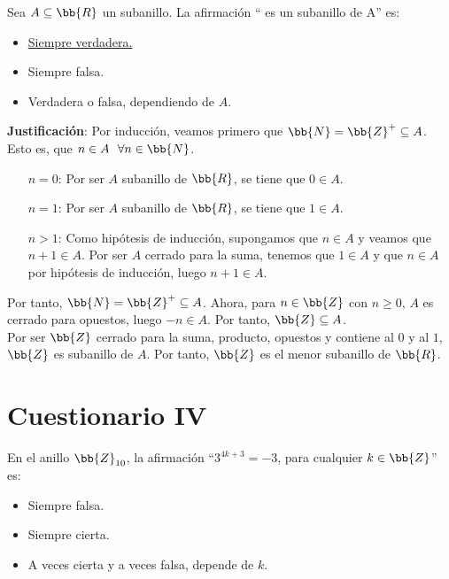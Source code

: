 \documentclass[12pt]{article}
\newcounter{ejercicio}[section] %
\newcounter{ejercicio}
\newcommand{\resetearcontador}{%
  \setcounter{ejercicio}{0} %
}
\begin{document}
    \begin{ejercicio}
        Sea $A \subseteq \bb{R}$ un subanillo. La afirmación `` es un subanillo de A'' es:
        \begin{itemize}
            \item \underline{Siempre verdadera.}
            \item Siempre falsa.
            \item Verdadera o falsa, dependiendo de $A$.
        \end{itemize}

        \noindent
        \textbf{Justificación}:
        Por inducción, veamos primero que $\bb{N} = \bb{Z}^{+} \subseteq A$.\newline
        Esto es, que $n \in A~~\forall n \in \bb{N}$.
        \begin{enumerate}
            \item [$n=0$:]
                Por ser $A$ subanillo de $\bb{R}$, se tiene que $0 \in A$.
            \item [$n=1$:]
                Por ser $A$ subanillo de $\bb{R}$, se tiene que $1 \in A$.
            \item [$n>1$:]
                Como hipótesis de inducción, supongamos que $n \in A$ y veamos que $n+1 \in A$.\newline
                Por ser $A$ cerrado para la suma, tenemos que $1 \in A$ y que $n \in A$ por hipótesis de inducción, luego $n+1 \in A$.
        \end{enumerate}
        Por tanto, $\bb{N} = \bb{Z}^{+} \subseteq A$.\newline
        Ahora, para $n \in \bb{Z}$ con $n \geq 0$, $A$ es cerrado para opuestos, luego $-n \in A$.\newline
        Por tanto, $\bb{Z} \subseteq A$.\\

        \noindent
        Por ser $\bb{Z}$ cerrado para la suma, producto, opuestos y contiene al $0$ y al $1$, $\bb{Z}$ es subanillo de $A$. Por tanto, $\bb{Z}$ es el menor subanillo de $\bb{R}$.
    \end{ejercicio}

    \newpage
    \resetearcontador
    \section{Cuestionario IV}
    \begin{ejercicio}
        En el anillo $\bb{Z}_{10}$, la afirmación ``$3^{4k+3} = -3$, para cualquier $k \in \bb{Z}$'' es:
        \begin{itemize}
            \item Siempre falsa.
            \item Siempre cierta.
            \item A veces cierta y a veces falsa, depende de $k$.
        \end{itemize}
    \end{ejercicio}
\end{document}
